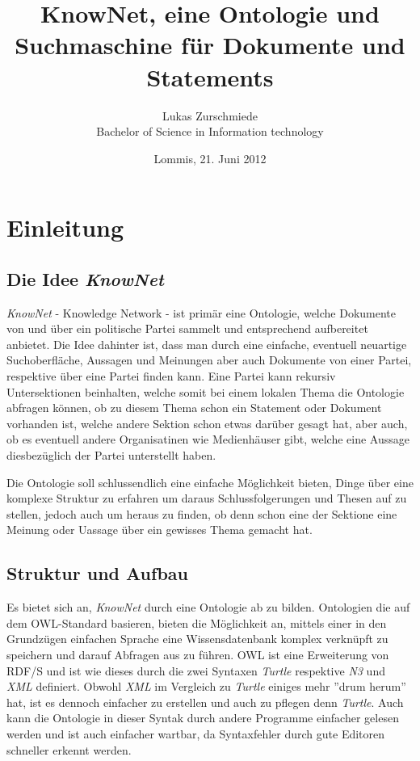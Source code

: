 \documentclass[
    11pt,
    latin1,
    a4paper,
    oneside
]{scrreprt}
\author{Lukas Zurschmiede\\Bachelor of Science in Information technology}
\date{Lommis, 21. Juni 2012}
\title{KnowNet, eine Ontologie und Suchmaschine f\"ur Dokumente und Statements}
\begin{document}
\maketitle

\newpage
\singlespacing
\tableofcontents

\pagebreak
\onehalfspacing
\setcounter{page}{1}

\chapter{Einleitung} \label{sec:introduction}

\section{Die Idee \emph{KnowNet}}

\emph{KnowNet} - Knowledge Network - ist prim\"ar eine Ontologie, welche Dokumente von und \"uber ein politische Partei sammelt und entsprechend aufbereitet anbietet. Die Idee dahinter ist, dass man durch eine einfache, eventuell neuartige Suchoberfl\"ache, Aussagen und Meinungen aber auch Dokumente von einer Partei, respektive \"uber eine Partei finden kann. Eine Partei kann rekursiv Untersektionen beinhalten, welche somit bei einem lokalen Thema die Ontologie abfragen k\"onnen, ob zu diesem Thema schon ein Statement oder Dokument vorhanden ist, welche andere Sektion schon etwas dar\"uber gesagt hat, aber auch, ob es eventuell andere Organisatinen wie Medienh\"auser gibt, welche eine Aussage diesbez\"uglich der Partei unterstellt haben.

Die Ontologie soll schlussendlich eine einfache M\"oglichkeit bieten, Dinge \"uber eine komplexe Struktur zu erfahren um daraus Schlussfolgerungen und Thesen auf zu stellen, jedoch auch um heraus zu finden, ob denn schon eine der Sektione eine Meinung oder Uassage \"uber ein gewisses Thema gemacht hat.

\section{Struktur und Aufbau} \label{sec:structure}

Es bietet sich an, \emph{KnowNet} durch eine Ontologie ab zu bilden. Ontologien die auf dem OWL-Standard\cite{W3COWL} basieren, bieten die M\"oglichkeit an, mittels einer in den Grundz\"ugen einfachen Sprache eine Wissensdatenbank komplex verkn\"upft zu speichern und darauf Abfragen aus zu f\"uhren. OWL ist eine Erweiterung von RDF/S und ist wie dieses durch die zwei Syntaxen \emph{Turtle} respektive \emph{N3} und \emph{XML} definiert. Obwohl \emph{XML} im Vergleich zu \emph{Turtle} einiges mehr ''drum herum'' hat, ist es dennoch einfacher zu erstellen und auch zu pflegen denn \emph{Turtle}. Auch kann die Ontologie in dieser Syntak durch andere Programme einfacher gelesen werden und ist auch einfacher wartbar, da Syntaxfehler durch gute Editoren schneller erkennt werden.
\end{document}
